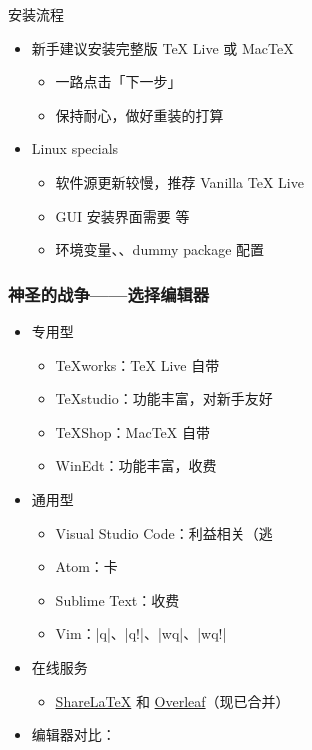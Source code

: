 \begin{frame}{安装流程}
\begin{itemize}
  \item 新手建议安装完整版 \TeX{} Live 或 Mac\TeX{}
    \begin{itemize}
      \item 一路点击「下一步」
      \item 保持耐心，做好重装的打算
    \end{itemize}
  \item Linux specials
    \begin{itemize}
      \item 软件源更新较慢，推荐 Vanilla \TeX{} Live
      \item GUI 安装界面需要  等
      \item 环境变量、、dummy package 配置
    \end{itemize}
\end{itemize}
\end{frame}

\begin{frame}[fragile]
\frametitle{神圣的战争——选择编辑器}
\begin{itemize}
  \item 专用型
    \begin{itemize}
      \item TeXworks：\TeX{} Live 自带 \faWindows{} \faApple{} \faLinux{}
      \item TeXstudio：功能丰富，对新手友好 \faWindows{} \faApple{} \faLinux{}
      \item TeXShop：Mac\TeX{} 自带 \faApple{}
      \item WinEdt：功能丰富，收费 \faWindows{}
    \end{itemize}
  \item 通用型
    \begin{itemize}
      \item Visual Studio Code：利益相关（逃
      \item Atom：卡
      \item Sublime Text：收费
      \item Vim：|q|、|q!|、|wq|、|wq!|
    \end{itemize}
  \item 在线服务
    \begin{itemize}
      \item \href{https://www.sharelatex.com}{\textcolor{酡红}{ShareLaTeX}} 和
            \href{https://www.overleaf.com}{\textcolor{松花绿}{Overleaf}}（现已合并）
    \end{itemize}
  \item 编辑器对比：
\end{itemize}
\end{frame}
